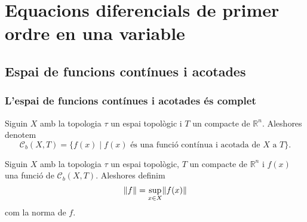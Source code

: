 \documentclass[../Apunts.tex]{subfiles}
\begin{document}
\chapter{Equacions diferencials de primer ordre en una variable}
	\section{Espai de funcions contínues i acotades}
	\subsection{L'espai de funcions contínues i acotades és complet}
	\begin{notation}
		\label{notation:espai de funcions contínues i acotades}
		Siguin \(X\) amb la topologia \(\tau\) un espai topològic i \(T\) un compacte de \(\mathbb{R}^{n}\). Aleshores denotem
		\[\mathcal{C}_{b}(X,T)=\{f(x)\mid f(x)\text{ és una funció contínua i acotada de }X\text{ a }T\}.\]
	\end{notation}
	\begin{definition}
		\label{def:norma d'una funció}
		Siguin \(X\) amb la topologia \(\tau\) un espai topològic, \(T\) un compacte de \(\mathbb{R}^{n}\) i \(f(x)\) una funció de \(\mathcal{C}_{b}(X,T)\). Aleshores definim
		\[\norm{f}=\sup_{x\in X}\norm{f(x)}\]
		com la norma de \(f\).
	\end{definition}
\end{document}
